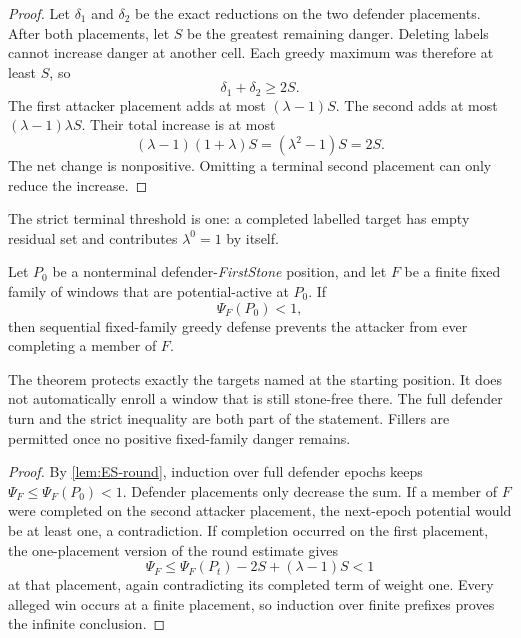 \begin{proof}
Let $\delta_1$ and $\delta_2$ be the exact reductions on the two defender
placements.  After both placements, let $S$ be the greatest remaining danger.
Deleting labels cannot increase danger at another cell.  Each greedy maximum
was therefore at least $S$, so
\[
 \delta_1+\delta_2\geq2S.
\]
The first attacker placement adds at most $(\lambda-1)S$.  The second adds at
most $(\lambda-1)\lambda S$.  Their total increase is at most
\[
 (\lambda-1)(1+\lambda)S=(\lambda^2-1)S=2S.
\]
The net change is nonpositive.  Omitting a terminal second placement can only
reduce the increase.
\end{proof}

The strict terminal threshold is one: a completed labelled target has empty
residual set and contributes $\lambda^0=1$ by itself.

\begin{theorem}
\label{thm:ES-fixed-family}
Let $P_0$ be a nonterminal defender-\emph{FirstStone} position, and let $F$ be
a finite fixed family of windows that are potential-active at $P_0$.  If
\[
 \Psi_F(P_0)<1,
\tag{10.4}
\]
then sequential fixed-family greedy defense prevents the attacker from ever
completing a member of $F$.
\end{theorem}

\begin{plainterms}
The theorem protects exactly the targets named at the starting position.  It
does not automatically enroll a window that is still stone-free there.  The
full defender turn and the strict inequality are both part of the statement.
Fillers are permitted once no positive fixed-family danger remains.
\end{plainterms}

\begin{proof}
By \cref{lem:ES-round}, induction over full defender epochs keeps
$\Psi_F\leq\Psi_F(P_0)<1$.  Defender placements only decrease the sum.  If a
member of $F$ were completed on the second attacker placement, the next-epoch
potential would be at least one, a contradiction.  If completion occurred on
the first placement, the one-placement version of the round estimate gives
\[
 \Psi_F\leq \Psi_F(P_t)-2S+(\lambda-1)S<1
\]
at that placement, again contradicting its completed term of weight one.
Every alleged win occurs at a finite placement, so induction over finite
prefixes proves the infinite conclusion.
\end{proof}

